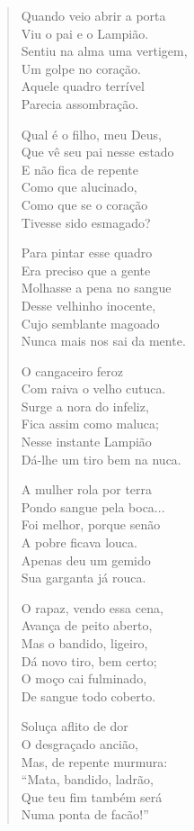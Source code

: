 \begin{verse}
Quando veio abrir a porta\\
Viu o pai e o Lampião.\\
Sentiu na alma uma vertigem,\\
Um golpe no coração.\\
Aquele quadro terrível\\
Parecia assombração.

Qual é o filho, meu Deus,\\
Que vê seu pai nesse estado\\
E não fica de repente\\
Como que alucinado,\\
Como que se o coração\\
Tivesse sido esmagado?
\pagebreak

Para pintar esse quadro\\
Era preciso que a gente\\
Molhasse a pena no sangue\\
Desse velhinho inocente,\\
Cujo semblante magoado\\
Nunca mais nos sai da mente.

O cangaceiro feroz\\
Com raiva o velho cutuca.\\
Surge a nora do infeliz,\\
Fica assim como maluca;\\
Nesse instante Lampião\\
Dá-lhe um tiro bem na nuca.

A mulher rola por terra\\
Pondo sangue pela boca...\\
Foi melhor, porque senão \\
A pobre ficava louca.\\
Apenas deu um gemido\\
Sua garganta já rouca.

O rapaz, vendo essa cena,\\
Avança de peito aberto,\\
Mas o bandido, ligeiro,\\
Dá novo tiro, bem certo;\\
O moço cai fulminado,\\
De sangue todo coberto.
\pagebreak

Soluça aflito de dor\\
O desgraçado ancião,\\
Mas, de repente murmura:\\
“Mata, bandido, ladrão,\\
Que teu fim também será\\
Numa ponta de facão!”


\end{verse}
